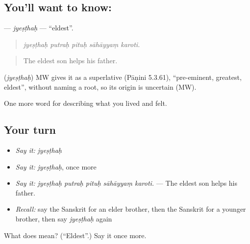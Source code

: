 \subsection*{You'll want to know: }
\textbf{} — \emph{jyeṣṭhaḥ} — \textquotedblleft{}eldest\textquotedblright{}.

\begin{quote}
    
\end{quote}

\begin{quote}
\emph{jyeṣṭhaḥ putraḥ pituḥ sāhāyyaṃ karoti.}
\end{quote}

\begin{quote}
The eldest son helps his father.
\end{quote}

\begin{cousinweb}
\textbf{} (\emph{jyeṣṭhaḥ}) MW gives it as a superlative (Pāṇini 5.3.61), \textquotedblleft{}pre-eminent, greatest, eldest\textquotedblright{}, without naming a root, so its origin is uncertain (MW).
\end{cousinweb}

\begin{grammarlens}[title={What you've built}]
One more word for describing what you lived and felt.
\end{grammarlens}

\subsection*{Your turn}
\begin{itemize}
\raggedright
  \item \emph{Say it:} \emph{jyeṣṭhaḥ}
  \item \emph{Say it:} \emph{jyeṣṭhaḥ}, once more
  \item \emph{Say it:} \emph{jyeṣṭhaḥ putraḥ pituḥ sāhāyyaṃ karoti.} — The eldest son helps his father.
  \item \emph{Recall:} say the Sanskrit for an elder brother, then the Sanskrit for a younger brother, then say \emph{jyeṣṭhaḥ} again
\end{itemize}

\begin{tcolorbox}[breakable,colback=teal!4,colframe=teal!35!black,title={Before you move on}]
What does  mean? (\textquotedblleft{}Eldest\textquotedblright{}.) Say it once more.
\end{tcolorbox}
